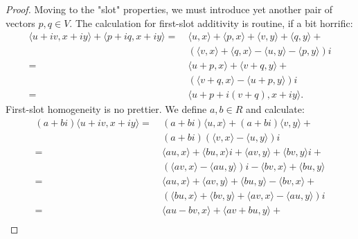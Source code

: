 \documentclass{article}
\theoremstyle{definition}
\begin{document}
\begin{proof}
	Moving to the "slot" properties, we must introduce yet another pair of vectors $p, q \in V$.
	The calculation for first-slot additivity is routine, if a bit horrific: \begin{align*}
		\langle u + iv, x + iy \rangle + \langle p + iq, x + iy \rangle =\  & \langle u, x \rangle + \langle p, x \rangle + \langle v, y \rangle + \langle q, y \rangle +  \\
		                                                                    & (\langle v, x \rangle + \langle q, x \rangle - \langle u, y \rangle - \langle p, y \rangle)i \\
		=\                                                                  & \langle u + p, x \rangle + \langle v + q, y \rangle +                                        \\
		                                                                    & \left( \langle v + q, x \rangle - \langle u + p, y \rangle \right)i                          \\
		=\                                                                  & \langle u + p + i(v + q), x + iy \rangle.
	\end{align*}
	First-slot homogeneity is no prettier.
	We define $a, b \in R$ and calculate: \begin{align*}
		(a + bi) \langle u + iv, x + iy \rangle =\  & (a + bi)\langle u, x \rangle + (a + bi)\langle v, y \rangle +                                       \\
		                                            & (a + bi)\left( \langle v, x \rangle - \langle u, y \rangle \right)i                                 \\
		=\                                          & \langle au, x \rangle + \langle bu, x \rangle i + \langle av, y \rangle + \langle bv, y \rangle i + \\
		                                            & (\langle av, x \rangle - \langle au, y \rangle)i - \langle bv, x \rangle + \langle bu, y \rangle    \\
		=\                                          & \langle au, x \rangle + \langle av, y \rangle + \langle bu, y \rangle - \langle bv, x \rangle +     \\
		                                            & (\langle bu, x \rangle + \langle bv, y \rangle + \langle av, x \rangle - \langle au, y \rangle)i    \\
		=\                                          & \langle au - bv, x \rangle + \langle av + bu, y \rangle +                                           \\

\end{align*}
\end{proof}
\end{document}
